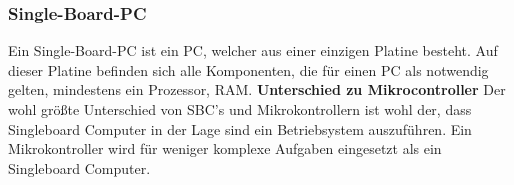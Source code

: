 \subsubsection{Single-Board-PC}
\label{subsec:Single-Board-PC}
Ein Single-Board-PC ist ein PC, welcher aus einer einzigen Platine besteht. Auf dieser Platine befinden sich alle Komponenten, die für einen PC als notwendig gelten, mindestens ein Prozessor, RAM. 
\nextline
\textbf{Unterschied zu Mikrocontroller\nextline}
Der wohl größte Unterschied von SBC’s und Mikrokontrollern ist wohl der, dass Singleboard Computer in der Lage sind ein Betriebsystem auszuführen. Ein Mikrokontroller wird für weniger komplexe Aufgaben eingesetzt als ein Singleboard Computer.


\clearpage %